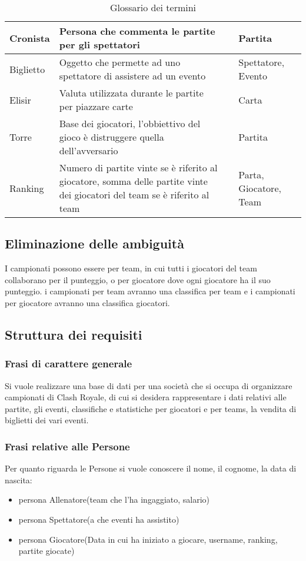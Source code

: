 \documentclass{article}
\begin{document}
\begin{table}
\begin{tabularx}{\textwidth}{|l|X|l|X|}
Cronista & Persona che commenta le partite per gli spettatori & & Partita \\ \hline
Biglietto & Oggetto che permette ad uno spettatore di assistere ad un evento & & Spettatore, Evento \\ \hline
Elisir    & Valuta utilizzata durante le partite per piazzare carte & & Carta \\ \hline
Torre     & Base dei giocatori, l'obbiettivo del gioco è distruggere quella dell'avversario & & Partita \\ \hline
Ranking   & Numero di partite vinte se è riferito al giocatore, somma delle partite vinte dei giocatori del team se è riferito al team & & Parta, Giocatore, Team \\ \hline
\end{tabularx}
\caption{Glossario dei termini}
\label{table_glossario_termini}
\end{table}


\subsection{Eliminazione delle ambiguità}

I campionati possono essere per team, in cui tutti i giocatori del team collaborano per il punteggio, o per giocatore dove ogni giocatore ha il suo punteggio. i campionati per team avranno una classifica per team e i campionati per giocatore avranno una classifica giocatori.

\subsection{Struttura dei requisiti}

\subsubsection{Frasi di carattere generale}

Si vuole realizzare una base di dati per una società che si occupa di organizzare campionati di Clash Royale, di cui si desidera rappresentare i dati relativi alle partite, gli eventi, classifiche e statistiche per giocatori e per teams, la vendita di biglietti dei vari eventi.

\subsubsection{Frasi relative alle Persone}

Per quanto riguarda le Persone si vuole conoscere il nome, il cognome, la data di nascita:
\begin{itemize}
    \item persona Allenatore(team che l'ha ingaggiato, salario)
    \item persona Spettatore(a che eventi ha assistito)
    \item persona Giocatore(Data in cui ha iniziato a giocare, username, ranking, partite giocate)
\end{itemize}
\end{document}
